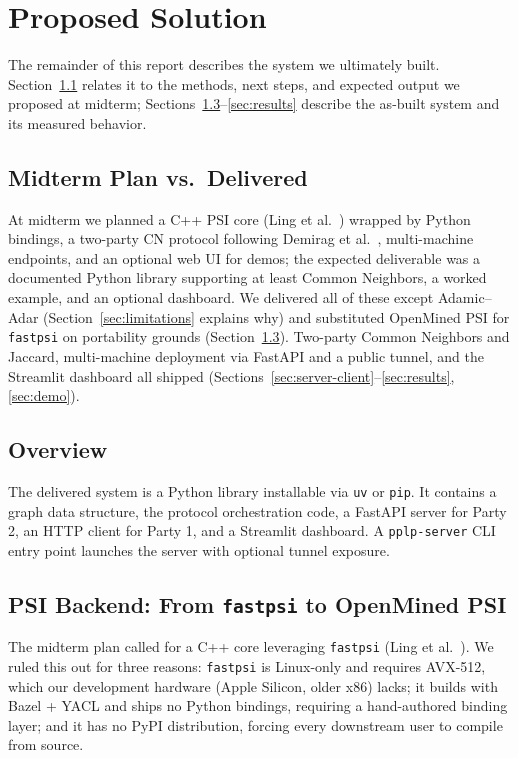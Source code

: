 \documentclass[sigconf]{acmart}
\begin{document}
\section{Proposed Solution}
\label{sec:proposed-solution}

The remainder of this report describes the system we ultimately built. Section~\ref{sec:midterm-deltas} relates it to the methods, next steps, and expected output we proposed at midterm; Sections~\ref{sec:psi-backend}--\ref{sec:results} describe the as-built system and its measured behavior.

\subsection{Midterm Plan vs.\ Delivered}
\label{sec:midterm-deltas}
At midterm we planned a C++ PSI core (Ling et al.~\cite{ling2025ultrafast}) wrapped by Python bindings, a two-party CN protocol following Demirag et al.~\cite{Demirag2022}, multi-machine endpoints, and an optional web UI for demos; the expected deliverable was a documented Python library supporting at least Common Neighbors, a worked example, and an optional dashboard. We delivered all of these except Adamic--Adar (Section~\ref{sec:limitations} explains why) and substituted OpenMined PSI for \texttt{fastpsi} on portability grounds (Section~\ref{sec:psi-backend}). Two-party Common Neighbors and Jaccard, multi-machine deployment via FastAPI and a public tunnel, and the Streamlit dashboard all shipped (Sections~\ref{sec:server-client}--\ref{sec:results}, \ref{sec:demo}).

\subsection{Overview}
The delivered system is a Python library installable via \texttt{uv} or \texttt{pip}. It contains a graph data structure, the protocol orchestration code, a FastAPI server for Party 2, an HTTP client for Party 1, and a Streamlit dashboard. A \texttt{pplp-server} CLI entry point launches the server with optional tunnel exposure.

\subsection{PSI Backend: From \texttt{fastpsi} to OpenMined PSI}
\label{sec:psi-backend}
The midterm plan called for a C++ core leveraging \texttt{fastpsi} (Ling et al.~\cite{ling2025ultrafast}). We ruled this out for three reasons: \texttt{fastpsi} is Linux-only and requires AVX-512, which our development hardware (Apple Silicon, older x86) lacks; it builds with Bazel + YACL and ships no Python bindings, requiring a hand-authored binding layer; and it has no PyPI distribution, forcing every downstream user to compile from source.
\end{document}
